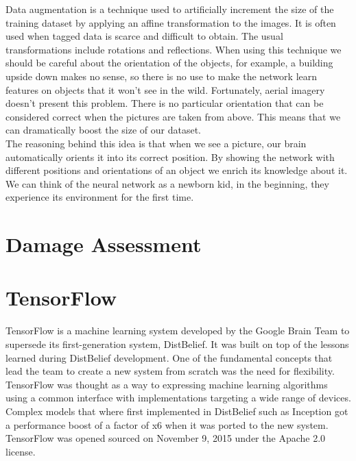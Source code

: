 Data augmentation is a technique used to artificially increment the size of the training dataset by applying an affine transformation to the images. It is often used when tagged data is scarce and difficult to obtain. The usual transformations include rotations and reflections. When using this technique we should be careful about the orientation of the objects, for example, a building upside down makes no sense, so there is no use to make the network learn features on objects that it won't see in the wild. Fortunately, aerial imagery doesn't present this problem. There is no particular orientation that can be considered correct when the pictures are taken from above. This means that we can dramatically boost the size of our dataset.\\

The reasoning behind this idea is that when we see a picture, our brain automatically orients it into its correct position. By showing the network with different positions and orientations of an object we enrich its knowledge about it.\\

We can think of the neural network as a newborn kid, in the beginning, they experience its environment for the first time.\\



\section{Damage Assessment}



\section{TensorFlow}

TensorFlow is a machine learning system developed by the Google Brain Team to supersede its first-generation system, DistBelief. It was built on top of the lessons learned during DistBelief development. One of the fundamental concepts that lead the team to create a new system from scratch was the need for flexibility. TensorFlow was thought as a way to expressing machine learning algorithms using a common interface with implementations targeting a wide range of devices. Complex models that where first implemented in DistBelief such as Inception got a performance boost of a factor of x6 \cite{tensorflow2015-whitepaper} when it was ported to the new system. TensorFlow was opened sourced on November 9, 2015 under the Apache 2.0 license.\\ 

